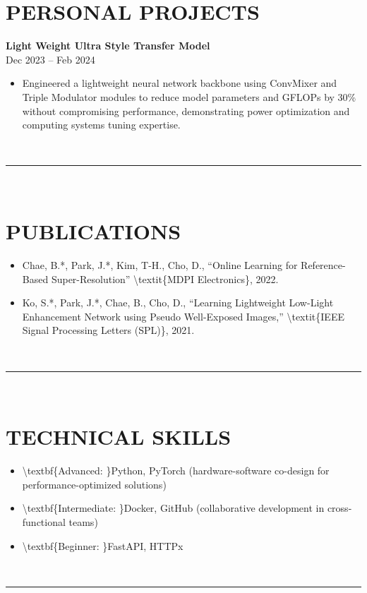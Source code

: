 \documentclass{article}%
\begin{document}
%
\section*{PERSONAL PROJECTS}%
\label{sec:PERSONALPROJECTS}%
\textbf{Light Weight Ultra Style Transfer Model}%
\\%
Dec 2023 – Feb 2024%
\begin{itemize}%
\item%
Engineered a lightweight neural network backbone using ConvMixer and Triple Modulator modules to reduce model parameters and GFLOPs by 30\% without compromising performance, demonstrating power optimization and computing systems tuning expertise.%
\end{itemize}%
\\[1em]%
\hrule%
\\[1em]

%
\section*{PUBLICATIONS}%
\label{sec:PUBLICATIONS}%
\begin{itemize}%
\item%
Chae, B.*, Park, J.*, Kim, T{-}H., Cho, D., “Online Learning for Reference{-}Based Super{-}Resolution” \textbackslash{}textit\{MDPI Electronics\}, 2022.%
\item%
Ko, S.*, Park, J.*, Chae, B., Cho, D., “Learning Lightweight Low{-}Light Enhancement Network using Pseudo Well{-}Exposed Images,” \textbackslash{}textit\{IEEE Signal Processing Letters (SPL)\}, 2021.%
\end{itemize}%
\\[1em]%
\hrule%
\\[1em]

%
\section*{TECHNICAL SKILLS}%
\label{sec:TECHNICALSKILLS}%
\begin{itemize}%
\item%
\textbackslash{}textbf\{Advanced: \}Python, PyTorch (hardware{-}software co{-}design for performance{-}optimized solutions)%
\item%
\textbackslash{}textbf\{Intermediate: \}Docker, GitHub (collaborative development in cross{-}functional teams)%
\item%
\textbackslash{}textbf\{Beginner: \}FastAPI, HTTPx%
\end{itemize}%
\\[1em]%
\hrule%
\\[1em]
\end{document}
